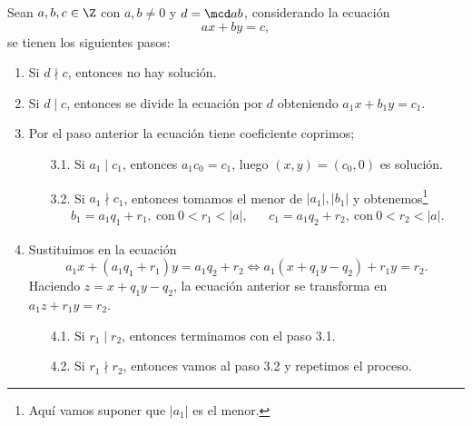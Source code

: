\documentclass[12pt]{article}
\begin{document}
    Sean $a,b, c \in \Z$ con $a,b \neq 0$ y $d = \mcd a b$, considerando la ecuación
    \[
        ax + by = c,
    \]
    se tienen los siguientes pasos:
    \begin{enumerate}
        \item Si $d\nmid c$, entonces no hay solución.
        \item Si $d \mid c$, entonces se divide la ecuación por $d$ obteniendo $a_1 x + b_1 y = c_1$.
        \item Por el paso anterior la ecuación tiene coeficiente coprimos;
        \begin{enumerate}
            \item[3.1.] Si $a_1 \mid c_1$, entonces $a_1 c_0 = c_1$, luego $(x,y) = (c_0, 0)$ es solución.
            \item[3.2.] Si $a_1 \nmid c_1$, entonces tomamos el menor de $|a_1|, |b_1|$ y obtenemos\footnote{Aquí vamos suponer que $|a_1|$ es el menor.}
            \begin{align*}
                b_1 = a_1 q_1 + r_1,\ \text{con}\ 0<r_1<|a|, && c_1 = a_1 q_2 + r_2,\ \text{con}\ 0 < r_2 < |a|.
            \end{align*}
        \end{enumerate}
        \item Sustituimos en la ecuación
        \[
            a_1 x + (a_1 q_1 + r_1) y = a_1 q_2 + r_2 \iff a_1 (x + q_1 y - q_2) + r_1 y = r_2.
        \]
        Haciendo $z = x + q_1 y - q_2$, la ecuación anterior se transforma en $a_1 z + r_1 y = r_2$.
        \begin{enumerate}
            \item[4.1.] Si $r_1 \mid r_2$, entonces terminamos con el paso 3.1.
            \item[4.2.] Si $r_1 \nmid r_2$, entonces vamos al paso 3.2 y repetimos el proceso.
        \end{enumerate}
    \end{enumerate}
\end{document}
